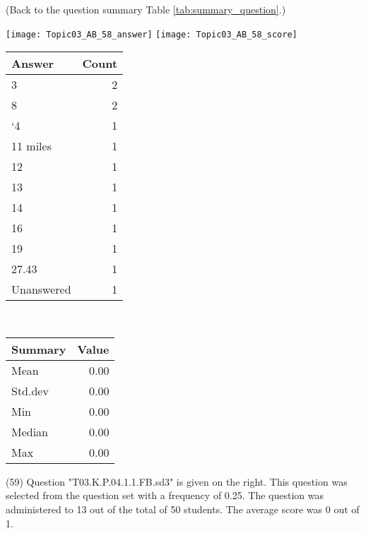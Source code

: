 \documentclass[12pt,english,nohyper]{tufte-handout}\usepackage[]{graphicx}\usepackage[]{color}
\begin{document}
 (Back to the question summary Table \ref{tab:summary_question}.)

\begin{center} \texttt{[image: Topic03\_AB\_58\_answer]} \texttt{[image: Topic03\_AB\_58\_score]} \end{center} 

\begin{center}%
\begin{tabular}{lr}
  \hline
Answer & Count \\ 
  \hline
3 &   2 \\ 
  8 &   2 \\ 
  `4 &   1 \\ 
  11 miles &   1 \\ 
  12 &   1 \\ 
  13 &   1 \\ 
  14 &   1 \\ 
  16 &   1 \\ 
  19 &   1 \\ 
  27.43 &   1 \\ 
  Unanswered &   1 \\ 
   \hline
\end{tabular}
~~~~~~~~%
\begin{tabular}{lr}
  \hline
Summary & Value \\ 
  \hline
Mean & 0.00 \\ 
  Std.dev & 0.00 \\ 
  Min & 0.00 \\ 
  Median & 0.00 \\ 
  Max & 0.00 \\ 
   \hline
\end{tabular}
\end{center}\newpage{} (59) Question "T03.K.P.04.1.1.FB.sd3" is given on the right. This question was selected from the question set with a frequency of 0.25. The question was administered to 13 out of the total of 50 students. The average score was 0 out of 1.
\end{document}
